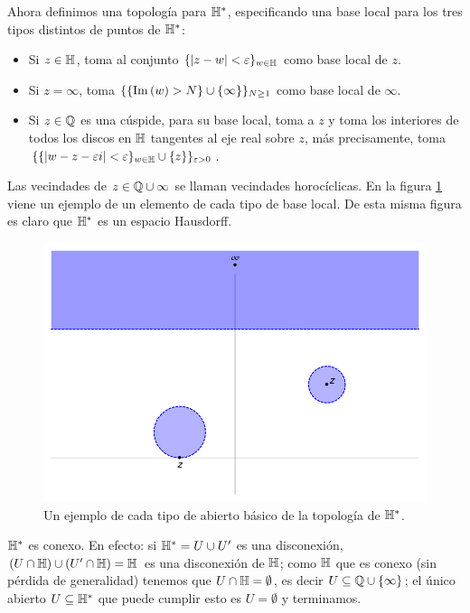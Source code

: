 Ahora definimos una topolog\'ia para $\mathbb{H}^*$, especificando una base
local para los tres tipos distintos de puntos de $\mathbb{H}^*$:
\begin{itemize}
\item Si $z\in\mathbb{H}$, toma al conjunto $\{\left| z-w \right|<\varepsilon\}_{w\in\mathbb{H}}$ como base local de $z$.
\item Si $z=\infty$, toma $\{\{\mathrm{Im}\left( w \right)>N\}\cup\{\infty\}\}_{N\geq1}$ como base local de $\infty$.
\item Si $z\in\mathbb{Q}$ es una c\'uspide, para su base local, toma a $z$ y toma los interiores de todos
  los discos en $\mathbb{H}$ tangentes al eje real sobre $z$, m\'as precisamente, toma
  $\{\{\left| w-z-\varepsilon i \right|<\varepsilon\}_{w\in\mathbb{H}}\cup\{z\}\}_{\varepsilon>0}$.
\end{itemize}
Las vecindades de $z\in\mathbb{Q}\cup\infty$ se llaman vecindades horoc\'iclicas. En la figura
\ref{fig:topologiaH} viene un ejemplo de un elemento de cada tipo de base local.
De esta misma figura es claro que $\mathbb{H}^*$ es un espacio Hausdorff.
\begin{figure}[h]%
  \centering
  \includegraphics[scale=0.35]{figuras/topologiaH}
  \caption{Un ejemplo de cada tipo de abierto b\'asico de la topolog\'ia de $\mathbb{H}^*$.}
  \label{fig:topologiaH}
\end{figure}%

\begin{nota}
  $\mathbb{H}^*$ es conexo. En efecto: si $\mathbb{H}^*=U\cup U'$ es una disconexi\'on,
  $(U\cap\mathbb{H})\cup(U'\cap\mathbb{H})=\mathbb{H}$ es una disconexi\'on de $\mathbb{H}$; como $\mathbb{H}$ que es conexo
  (sin p\'erdida de generalidad) tenemos que $U\cap\mathbb{H}=\emptyset$, es decir
  $U\subseteq\mathbb{Q}\cup\{\infty\}$; el \'unico abierto $U\subseteq\mathbb{H}^*$ que puede cumplir
  esto es $U=\emptyset$ y terminamos.
\end{nota}

